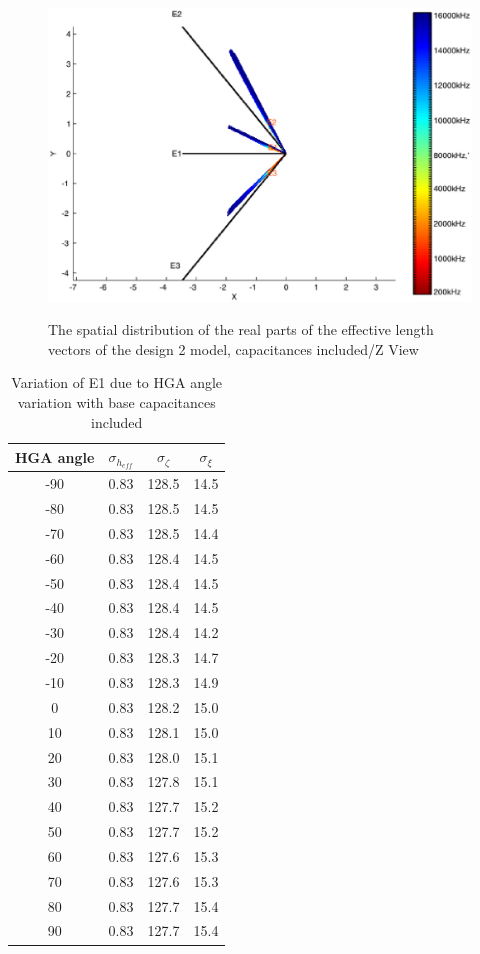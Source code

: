 \documentclass[a4paper,10pt]{thesis}
\begin{document}
\begin{figure}
\begin{center}
\includegraphics[width=12cm]{HeffVerteilungHGAD2-ZView_caps2.eps} \\
\caption{The spatial distribution of the real parts of the effective length vectors of the design 2 model, capacitances included/Z View}\label{fig_heff_dist_HGA_D2_A_Z_View_caps2}
\end{center}
\end{figure}


\begin{table}
\centering
\caption{Variation of E1 due to HGA angle variation with base capacitances included}\label{tab_e1_var}
\begin{tabular}{|c|c|c|c|}
  \hline
HGA angle & $\sigma_{h_{eff}}$ & $\sigma_{\zeta}$ & $\sigma_{\xi}$ \\
\hline
-90 & 0.83 & 128.5 & 14.5 \\
-80 & 0.83 & 128.5 & 14.5 \\
-70 & 0.83 & 128.5 & 14.4 \\
-60 & 0.83 & 128.4 & 14.5 \\
-50 & 0.83 & 128.4 & 14.5 \\
-40 & 0.83 & 128.4 & 14.5 \\
-30 & 0.83 & 128.4 & 14.2 \\
-20 & 0.83 & 128.3 & 14.7 \\
-10 & 0.83 & 128.3 & 14.9 \\
0 & 0.83 & 128.2 & 15.0 \\
10 & 0.83 & 128.1 & 15.0 \\
20 & 0.83 & 128.0 & 15.1 \\
30 & 0.83 & 127.8 & 15.1 \\
40 & 0.83 & 127.7 & 15.2 \\
50 & 0.83 & 127.7 & 15.2 \\
60 & 0.83 & 127.6 & 15.3 \\
70 & 0.83 & 127.6 & 15.3 \\
80 & 0.83 & 127.7 & 15.4 \\
90 & 0.83 & 127.7 & 15.4 \\
\hline\end{tabular}
\end{table}
\end{document}
